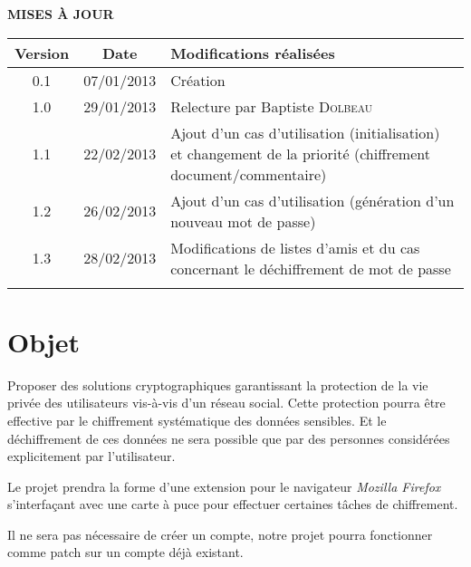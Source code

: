 \documentclass[a4paper,11pt,french]{article}
\begin{document}
\makeFirstPage
\clearpage

\vspace*{1cm}
\begin{center}
\textbf{\huge{MISES À JOUR}}\\
\vspace*{3cm}
	\begin{tabularx}{16cm}{|c|c|X|}
	\hline
	\bfseries{Version} & \bfseries{Date} & \bfseries{Modifications réalisées}\\
	\hline
	0.1 & 07/01/2013 & Création\\
	\hline
    1.0 & 29/01/2013 & Relecture par Baptiste \textsc{Dolbeau}\\
	\hline
    1.1 & 22/02/2013 & Ajout d'un cas d'utilisation (initialisation) et 
    changement de la priorité (chiffrement document/commentaire) \\
	\hline
    1.2 & 26/02/2013 & Ajout d'un cas d'utilisation (génération d'un nouveau
            mot de passe) \\
	\hline
    1.3 & 28/02/2013 & Modifications de listes d'amis et du cas concernant
    le déchiffrement de mot de passe \\
	\hline
	&&\\
	\hline
	\end{tabularx}
\end{center}

\clearpage
\tableofcontents
\clearpage

\section{Objet}
\renewcommand\labelitemi{\textbullet} %
\renewcommand\labelitemii{$\circ$} %
Proposer des solutions cryptographiques garantissant la protection de la vie 
privée des utilisateurs vis-à-vis d'un réseau social. Cette protection pourra
être effective par le chiffrement systématique des données sensibles. Et
le déchiffrement de ces données ne sera possible que par des personnes
considérées explicitement par l'utilisateur.


Le projet prendra la forme d'une extension pour le navigateur 
\emph{Mozilla Firefox}
s'interfaçant avec une carte à puce pour effectuer certaines tâches de 
chiffrement.

Il ne sera pas nécessaire de créer un compte, notre projet pourra fonctionner 
comme patch sur un compte déjà existant.
\end{document}
